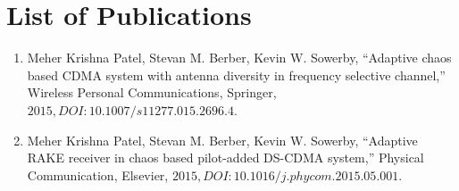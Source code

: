\chapter*{List of Publications}




\begin{enumerate}

\item Meher Krishna Patel, Stevan M. Berber, Kevin W. Sowerby, ``Adaptive chaos based CDMA system with antenna diversity in frequency selective channel,” Wireless Personal Communications, Springer, $2015, DOI:10.1007/s11277.015.2696.4$.

\item Meher Krishna Patel, Stevan M. Berber, Kevin W. Sowerby, ``Adaptive RAKE receiver in chaos based pilot-added DS-CDMA system,” Physical Communication, Elsevier, $2015, DOI: 10.1016/j.phycom.2015.05.001$.

\end{enumerate}